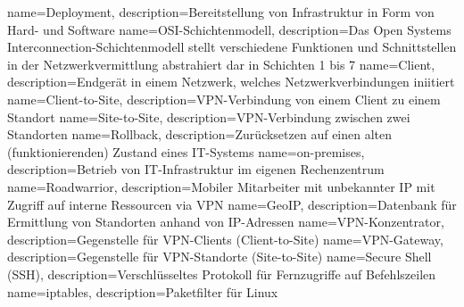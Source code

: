 {
        name=Deployment,
        description={Bereitstellung von Infrastruktur in Form von Hard- und Software}
}
{
        name=OSI-Schichtenmodell,
        description={Das Open Systems Interconnection-Schichtenmodell stellt verschiedene Funktionen und Schnittstellen in der Netzwerkvermittlung abstrahiert dar in Schichten 1 bis 7}
}
{
        name=Client,
        description={Endgerät in einem Netzwerk, welches Netzwerkverbindungen iniitiert}
}
{
        name=Client-to-Site,
        description={VPN-Verbindung von einem Client zu einem Standort}
}
{
        name=Site-to-Site,
        description={VPN-Verbindung zwischen zwei Standorten}
}
{
        name=Rollback,
        description={Zurücksetzen auf einen alten (funktionierenden) Zustand eines IT-Systems}
}
{
        name=on-premises,
        description={Betrieb von IT-Infrastruktur im eigenen Rechenzentrum}
}
{
        name=Roadwarrior,
        description={Mobiler Mitarbeiter mit unbekannter IP mit Zugriff auf interne Ressourcen via VPN}
}
{
        name=GeoIP,
        description={Datenbank für Ermittlung von Standorten anhand von IP-Adressen}
}
{
        name=VPN-Konzentrator,
        description=Gegenstelle für VPN-Clients (Client-to-Site)
}
{
        name=VPN-Gateway,
        description=Gegenstelle für VPN-Standorte (Site-to-Site)
}
{
        name=Secure Shell (SSH),
        description=Verschlüsseltes Protokoll für Fernzugriffe auf Befehlszeilen
} 
{
        name=iptables,
        description=Paketfilter für Linux
} 
